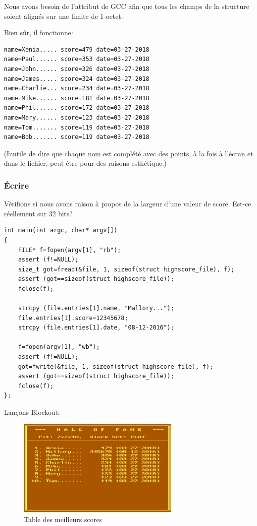 Nous avons besoin de l'attribut  de GCC afin que tous
les champs de la structure soient alignés sur une limite de 1-octet.

Bien sûr, il fonctionne:

\begin{lstlisting}
name=Xenia..... score=479 date=03-27-2018
name=Paul...... score=353 date=03-27-2018
name=John...... score=326 date=03-27-2018
name=James..... score=324 date=03-27-2018
name=Charlie... score=234 date=03-27-2018
name=Mike...... score=181 date=03-27-2018
name=Phil...... score=172 date=03-27-2018
name=Mary...... score=123 date=03-27-2018
name=Tom....... score=119 date=03-27-2018
name=Bob....... score=119 date=03-27-2018
\end{lstlisting}

(Inutile de dire que chaque nom est complété avec des points, à la fois à l'écran
et dans le fichier, peut-être pour des raisons esthétique.)

\subsubsection{Écrire}

Vérifions si nous avons raison à propos de la largeur d'une valeur de score. Est-ce
réellement sur 32 bits?

\begin{lstlisting}[style=customc]
int main(int argc, char* argv[])
{
	FILE* f=fopen(argv[1], "rb");
	assert (f!=NULL);
	size_t got=fread(&file, 1, sizeof(struct highscore_file), f);
	assert (got==sizeof(struct highscore_file));
	fclose(f);

	strcpy (file.entries[1].name, "Mallory...");
	file.entries[1].score=12345678;
	strcpy (file.entries[1].date, "08-12-2016");

	f=fopen(argv[1], "wb");
	assert (f!=NULL);
	got=fwrite(&file, 1, sizeof(struct highscore_file), f);
	assert (got==sizeof(struct highscore_file));
	fclose(f);
};
\end{lstlisting}

Lançons Blockout:

\begin{figure}[H]
\centering
\includegraphics[width=0.7\textwidth]{advanced/550_more_structs/blockout/hs345678.png}
\caption{Table des meilleurs scores}
\end{figure}

